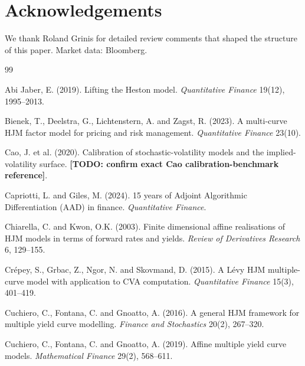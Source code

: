 \documentclass[11pt]{article}
\newcommand{\TODO}[1]{\textbf{[TODO: #1]}}
\theoremstyle{plain}
\theoremstyle{definition}
\begin{document}
\section*{Acknowledgements}
\noindent We thank Roland Grinis for detailed review comments that shaped the
structure of this paper. Market data: Bloomberg.

\begin{thebibliography}{99}

Abi Jaber, E. (2019). Lifting the Heston model.
\emph{Quantitative Finance} 19(12), 1995--2013.

Bienek, T., Deelstra, G., Lichtenstern, A. and Zagst, R. (2023).
A multi-curve HJM factor model for pricing and risk management.
\emph{Quantitative Finance} 23(10).

Cao, J. et al. (2020). Calibration of stochastic-volatility models and the
implied-volatility surface. \TODO{confirm exact Cao calibration-benchmark reference}.

Capriotti, L. and Giles, M. (2024). 15 years of Adjoint Algorithmic
Differentiation (AAD) in finance. \emph{Quantitative Finance}.

Chiarella, C. and Kwon, O.K. (2003). Finite dimensional affine realisations of
HJM models in terms of forward rates and yields.
\emph{Review of Derivatives Research} 6, 129--155.

Cr\'epey, S., Grbac, Z., Ngor, N. and Skovmand, D. (2015). A L\'evy HJM
multiple-curve model with application to CVA computation.
\emph{Quantitative Finance} 15(3), 401--419.

Cuchiero, C., Fontana, C. and Gnoatto, A. (2016). A general HJM framework for
multiple yield curve modelling. \emph{Finance and Stochastics} 20(2), 267--320.

Cuchiero, C., Fontana, C. and Gnoatto, A. (2019). Affine multiple yield curve
models. \emph{Mathematical Finance} 29(2), 568--611.


\end{thebibliography}
\end{document}
